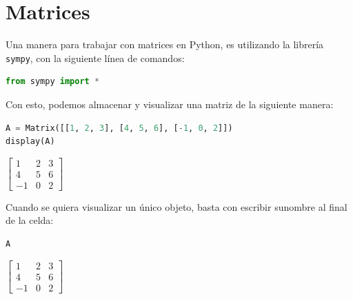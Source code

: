 \documentclass[a4,11pt]{aleph-notas}
\begin{document}
\encabezado


\section{Matrices}


Una manera para trabajar con matrices en Python, es utilizando la librería \texttt{sympy}, con la siguiente línea de comandos:

\begin{pycodigo}
    \begin{ipynbcodigo}\begin{lstlisting}[language=Python]
from sympy import *
    \end{lstlisting}\end{ipynbcodigo}
\end{pycodigo}

Con esto, podemos almacenar y visualizar una matriz de la siguiente manera:
\begin{pycodigo}
    \begin{ipynbcodigo}\begin{lstlisting}[language=Python]
A = Matrix([[1, 2, 3], [4, 5, 6], [-1, 0, 2]])
display(A)
    \end{lstlisting}\end{ipynbcodigo}
    \begin{ipynbsalida}[2mm]
        $\displaystyle \left[\begin{matrix}1 & 2 & 3\\4 & 5 & 6\\-1 & 0 & 2\end{matrix}\right]$
    \end{ipynbsalida}
\end{pycodigo}

    
Cuando se quiera visualizar un único objeto, basta con escribir sunombre al final de la celda:
\begin{pycodigo}
    \begin{ipynbcodigo}\begin{lstlisting}[language=Python]
A
    \end{lstlisting}\end{ipynbcodigo}
    \begin{ipynbsalida}[2mm]
        $\displaystyle \left[\begin{matrix}1 & 2 & 3\\4 & 5 & 6\\-1 & 0 & 2\end{matrix}\right]$
    \end{ipynbsalida}
\end{pycodigo}
    
\end{document}
